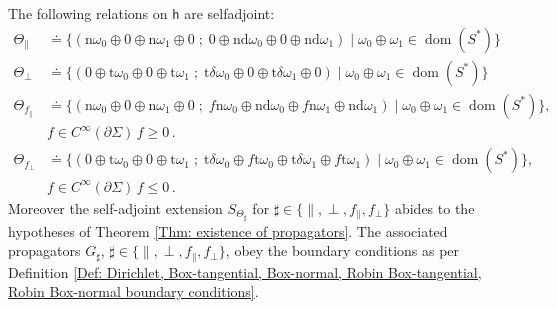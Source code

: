 \begin{proposition}\label{Prop: self-adjoint relation for parallel-, perp- and f,0- boundary conditions}
	The following relations on $\mathsf{h}$ are selfadjoint:
	\begin{align}
	\label{Eqn: parallel-relation}
	\Theta_\parallel&\doteq\lbrace
	(\mathrm{n}\omega_0\oplus
	0\oplus
	\mathrm{n}\omega_1\oplus
	0
	\;;\;
	0\oplus
	\mathrm{nd}\omega_0\oplus
	0\oplus
	\mathrm{nd}\omega_1
	)\;|\;\omega_0\oplus\omega_1\in \operatorname{dom}(S^*)\rbrace
	\\
	\label{Eqn: perp-relation}
	\Theta_\perp&\doteq\lbrace
	(0\oplus
	\mathrm{t}\omega_0\oplus
	0\oplus
	\mathrm{t}\omega_1
	\;;\;
	\mathrm{t}\delta\omega_0\oplus
	0\oplus
	\mathrm{t}\delta\omega_1\oplus
	0
	)\;|\;\omega_0\oplus\omega_1\in \operatorname{dom}(S^*)\rbrace
	\\
	\label{Eqn: f-relation}
	\nonumber\Theta_{f_\parallel}&\doteq\lbrace
	(\mathrm{n}\omega_0\oplus
	0\oplus
	\mathrm{n}\omega_1\oplus
	0
	\;;\;
	f\mathrm{n}\omega_0\oplus
	\mathrm{nd}\omega_0\oplus
	f\mathrm{n}\omega_1\oplus
	\mathrm{nd}\omega_1
	)\;|\;\omega_0\oplus\omega_1\in \operatorname{dom}(S^*)\rbrace,\\  &f\in C^\infty(\partial\Sigma)\, f\geq 0\,.\\
	\Theta_{f_\perp}&\doteq\lbrace
	(0\oplus
	\mathrm{t}\omega_0\oplus
	0\oplus
	\mathrm{t}\omega_1
	\;;\;
	\mathrm{t}\delta\omega_0\oplus
	f\mathrm{t}\omega_0\oplus
	\mathrm{t}\delta\omega_1\oplus
	f\mathrm{t}\omega_1
	)\;|\;\omega_0\oplus\omega_1\in \operatorname{dom}(S^*)\rbrace,\\ \nonumber &f\in C^\infty(\partial\Sigma)\, f\leq 0\,.
	\end{align}
	Moreover the self-adjoint extension $S_{\Theta_\sharp}$ for $\sharp\in\lbrace\parallel,\perp,f_\parallel,f_\perp\rbrace$ abides to the hypotheses of Theorem \ref{Thm: existence of propagators}. The associated propagators $G_\sharp$, $\sharp\in\lbrace\parallel,\perp,f_\parallel,f_\perp\rbrace$, obey the boundary conditions as per Definition \ref{Def: Dirichlet, Box-tangential, Box-normal, Robin Box-tangential, Robin Box-normal boundary conditions}.
\end{proposition}
